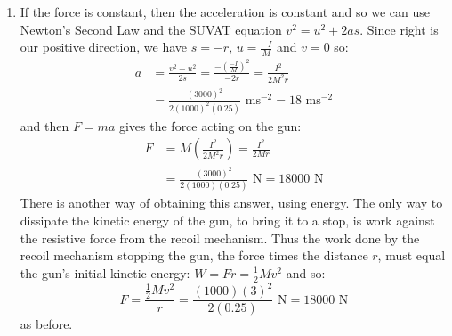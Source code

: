 \begin{problem}[A1972AMIIQ2l]
{\begin{enumerate}
Since momentum is conserved, their momenta must be equal:
\begin{align*} 
(M)(v) &= (m)(u \cos (\theta) - v) \\  
\frac{M}{m} &= \left( \frac{u \cos(\theta)}{v} - 1 \right) \\  
\frac{M}{m} + 1 &= \frac{u \cos(\theta)}{v} \\ 
v &= \frac{u \cos(\theta)}{\frac{M}{m} + 1} \\ 
v &= \frac{(306)(\frac{1}{2})}{\frac{(1000)}{(20)} + 1} \text{ ms}^{-1} = 3 \text{ ms}^{-1}
 \end{align*}

The impulse is the change in momentum, and so the momentum of either body will give the horizontal impulse: $I = Mv = (1000)(3) \text{ kg ms}^{-1} = m(u \cos(\theta) - v) = (20)(153 - 3)  \text{ kg ms}^{-1} = 3000  \text{ kg ms}^{-1}$.
The kinetic energy produced by the explosion is then the sum of the two kinetic energies: $E = \frac{1}{2}Mv^{2} + \frac{1}{2}m\left[\frac{(u \cos(\theta) - v)}{\cos(\theta)}\right]^{2} = \frac{1}{2}(1000)(3)^{2} + \frac{1}{2}(20)(306 - 6)^{2} \text{ J} = 904500 \text{ J}$ where we have been careful to get the full speed of the projectile relative to the ground.

Impulse is measured in kg ms$^{-1}$ (kilogram metres per second) or Ns (Newton seconds), where the former is expressed in SI base units but the two are completely equivalent (this can be shown by substituting in the definition $1 \text{ N} \equiv 1 \text{ kg ms}^{2}$). Energy is measured in J (Joules) or kg m$^{2}$s$^{-2}$ (kilogram meters squared per second squared), again equivalent units.
	\item If the force is constant, then the acceleration is constant and so we can use Newton's Second Law and the SUVAT equation $v^{2} = u^{2} + 2as$. Since right is our positive direction, we have $s = -r$, $u = \frac{-I}{M}$ and $v = 0$ so:
\begin{align*} 
a &= \frac{v^{2} - u^{2}}{2s} = \frac{-\left( \frac{-I}{M} \right)^{2}}{-2r} = \frac{I^{2}}{2M^{2}r} \\ 
&= \frac{(3000)^{2}}{2(1000)^{2}(0.25)} \text{ ms}^{-2} = 18 \text{ ms}^{-2} 
\end{align*}
and then $F = ma$ gives the force acting on the gun:
\begin{align*} 
F &= M \left( \frac{I^{2}}{2M^{2}r} \right) = \frac{I^{2}}{2Mr} \\ 
&= \frac{(3000)^{2}}{2(1000)(0.25)} \text{ N} = 18000 \text{ N} 
\end{align*}
There is another way of obtaining this answer, using energy. The only way to dissipate the kinetic energy of the gun, to bring it to a stop, is work against the resistive force from the recoil mechanism. Thus the work done by the recoil mechanism stopping the gun, the force times the distance $r$, must equal the gun's initial kinetic energy: $ W = Fr = \frac{1}{2}Mv^{2}$ and so:
\begin{equation*} 
F = \frac{\frac{1}{2}Mv^{2}}{r} = \frac{(1000)(3)^{2}}{2(0.25)} \text{ N} = 18000 \text{ N} 
\end{equation*} as before.


\end{enumerate}}
\end{problem}
